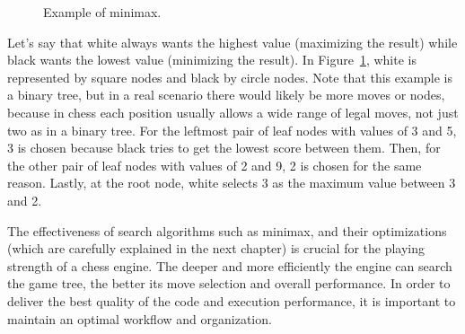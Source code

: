\begin{figure}[H]
    \centering
    \caption{Example of minimax.}
    \label{fig:minimax}
\end{figure}

\noindent Let's say that white always wants the highest value (maximizing the result) while black wants the lowest value (minimizing the result). In Figure~\ref{fig:minimax}, white is represented by square nodes and black by circle nodes. Note that this example is a binary tree, but in a real scenario there would likely be more moves or nodes, because in chess each position usually allows a wide range of legal moves, not just two as in a binary tree. For the leftmost pair of leaf nodes with values of 3 and 5, 3 is chosen because black tries to get the lowest score between them. Then, for the other pair of leaf nodes with values of 2 and 9, 2 is chosen for the same reason. Lastly, at the root node, white selects 3 as the maximum value between 3 and 2.

\vspace{1em}

\noindent The effectiveness of search algorithms such as minimax, and their optimizations (which are carefully explained in the next chapter) is crucial for the playing strength of a chess engine. The deeper and more efficiently the engine can search the game tree, the better its move selection and overall performance. In order to deliver the best quality of the code and execution performance, it is important to maintain an optimal workflow and organization.

